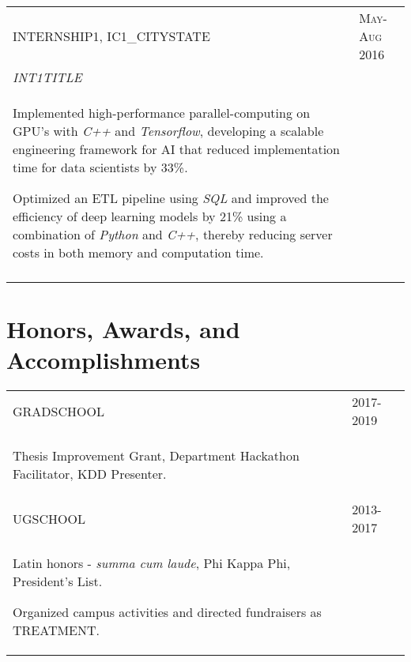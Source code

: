 \documentclass[a4paper,10pt]{article}
\begin{document}
\begin{supertabular}{p{13.9cm}>{\raggedleft\arraybackslash}p{3.4cm}}
	\textsc{INTERNSHIP1}, IC1_CITYSTATE
	& \textsc{May-Aug 2016} \\
	\small	\emph{INT1TITLE} & \\
	\begin{enumerate*}[label =$\circ$, itemjoin={\newline}]
		\item \footnotesize Implemented high-performance parallel-computing on GPU's with \emph{C++} and \emph{Tensorflow}, developing a scalable engineering framework for AI that reduced implementation time for data scientists by 33\%.
    \item \footnotesize Optimized an ETL pipeline using \emph{SQL} and improved the efficiency of deep learning models by 21\% using a combination of \emph{Python} and \emph{C++}, thereby reducing server costs in both memory and computation time.
	\end{enumerate*} & \\
	 \\


\end{supertabular}




\section{Honors, Awards, and Accomplishments}
\begin{supertabular}{p{13.9cm}>{\raggedleft\arraybackslash}p{3.4cm}}

	\textsc{GRADSCHOOL}
	& \textsc{2017-2019} \\
	\begin{enumerate*}[label =$\circ$, itemjoin={\newline}]
		\item \footnotesize Thesis Improvement Grant, Department Hackathon Facilitator, KDD Presenter.
	\end{enumerate*} \vspace{2mm} & \\

	\textsc{UGSCHOOL}
	& \textsc{2013-2017} \\
	\begin{enumerate*}[label =$\circ$, itemjoin={\newline}]
		\item \footnotesize  Latin honors - \emph{summa cum laude}, Phi Kappa Phi, President's List.
		\item \footnotesize  Organized campus activities and directed fundraisers as TREATMENT.
	\end{enumerate*} \vspace{0mm} & \\



\end{supertabular}
\end{document}
